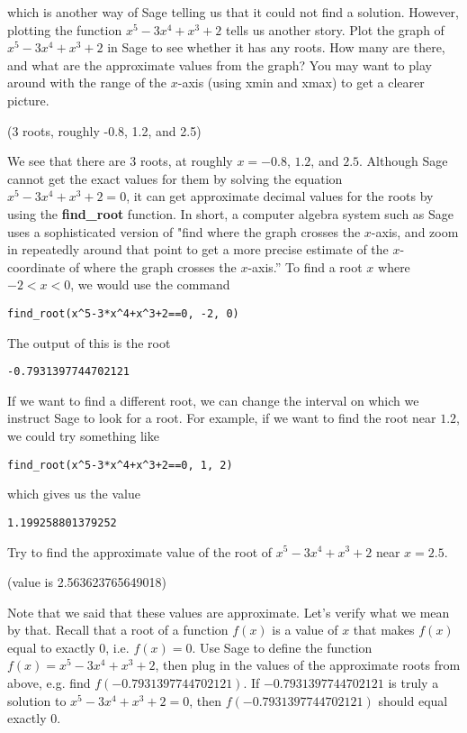 which is another way of Sage telling us that it could not find a solution.
However, plotting the function $x^5-3x^4+x^3+2$ tells us another story.
Plot the graph of $x^5-3x^4+x^3+2$ in Sage to see whether it has
any roots. How many are there, and what are the approximate values
from the graph? You may want to play around with the range of the
$x$-axis (using xmin and xmax) to get a clearer picture.

(3 roots, roughly -0.8, 1.2, and 2.5)

We see that there are 3 roots, at roughly $x=-0.8$, $1.2$, and $2.5$.
Although Sage cannot get the exact values for them by solving
the equation $x^5-3x^4+x^3+2=0$, it can get approximate decimal
values for the roots by using the \textbf{find\_root} function. In
short, a computer algebra system such as Sage uses a sophisticated
version of "find where the graph crosses the $x$-axis, and zoom in
repeatedly around that point to get a more precise estimate of the
$x$-coordinate of where the graph crosses the $x$-axis.'' To find
a root $x$ where $-2<x<0$, we would use the command

\begin{verbatim}
find_root(x^5-3*x^4+x^3+2==0, -2, 0)
\end{verbatim}

The output of this is the root

\begin{verbatim}
-0.7931397744702121
\end{verbatim}

If we want to find a different root, we can change the interval on
which we instruct Sage to look for a root. For example, if we want
to find the root near $1.2$, we could try something like

\begin{verbatim}
find_root(x^5-3*x^4+x^3+2==0, 1, 2)
\end{verbatim}

which gives us the value

\begin{verbatim}
1.199258801379252
\end{verbatim}

Try to find the approximate value of the root of $x^5-3x^4+x^3+2$
near $x=2.5$.

(value is 2.563623765649018)

Note that we said that these values are approximate. Let's verify
what we mean by that. Recall that a root of a function $f(x)$ is
a value of $x$ that makes $f(x)$ equal to exactly $0$, i.e.
$f(x)=0$. Use Sage to define the function $f(x)=x^5-3x^4+x^3+2$,
then plug in the values of the approximate roots from above,
e.g. find $f(-0.7931397744702121)$. If $-0.7931397744702121$
is truly a solution to $x^5-3x^4+x^3+2=0$, then
$f(-0.7931397744702121)$ should equal exactly 0.

